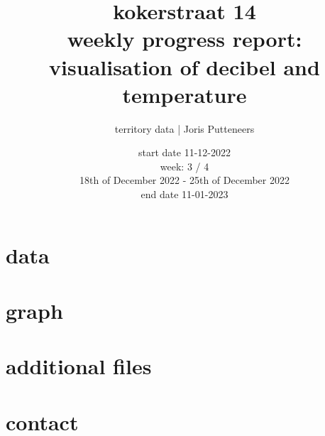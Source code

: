 \documentclass{article}
\author{territory data | Joris Putteneers}
\title{kokerstraat 14\\ \large weekly progress report: visualisation of {decibel} and temperature}
\date{start date 11-12-2022 \\week: 3 /   4 \\ 18th of December 2022 - 25th of December 2022 \\end date 11-01-2023 }
\begin{document}
  
\maketitle  
\tableofcontents 
\newpage 
\section{data} 
 
\section{graph} 
 
\section{additional files} 
 
\section{contact} 
 
\end{document}
